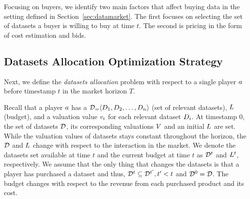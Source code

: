 Focusing on buyers, we identify two main factors that affect buying data in the setting defined in Section~\ref{sec:datamarket}. The first focuses on selecting the set of datasets a buyer is willing to buy at time $t$. The second is pricing in the form of cost estimation and bids. 

\subsection{Datasets Allocation Optimization Strategy}
Next, we define the \emph{datasets allocation} problem with respect to a single player $a$ before timestamp $t$ in the market horizon $T$.

Recall that a player $a$ has a $\mathcal{D}_ = \langle D_1, D_2, \dots, D_n\rangle$ (set of relevant datasets), $L$ (budget), and a valuation value $v_i$ for each relevant dataset $D_i$. At timestamp $0$, the set of datasets $\mathcal{D}$, its corresponding valuations $V$ and an initial $L$ are set. While the valuation values of datasets stays constant throughout the horizon, the $\mathcal{D}$ and $L$ change with respect to the interaction in the market. We denote the datasets set available at time $t$ and the current budget at time $t$ as $\mathcal{D}^{t}$ and $L^{t}$, respectively. We assume that the only thing that changes the datasets is that a player has purchased a dataset and thus, $\mathcal{D}^{t} \subseteq \mathcal{D}^{t^{\prime}}, t^{\prime}<t$ and $\mathcal{D}^{0} = \mathcal{D}$. The budget changes with respect to the revenue from each purchased product and its cost.  


